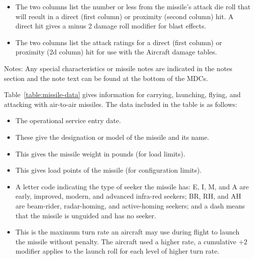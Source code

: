 {\begin{itemize}
    \item {} The two columns list the number or less from the missile's attack die roll that will result in a direct (first column) or proximity (second column) hit. A direct hit gives a minus 2 damage roll modifier for blast effects.

    \item {} The two columns list the attack ratings for a direct (first column) or  proximity (2d column) hit for use with the Aircraft damage tables.

\end{itemize}

Notes: Any special characteristics or missile notes are indicated in the notes section and the note text can be found at the bottom of the MDCs.

}{
Table~\ref{table:missile-data} gives information for carrying, launching, flying, and attacking with air-to-air missiles. The data included in the table is as follows:

\begin{itemize}

    \item {} The operational service entry date.
    
    \item {} These give the designation or model of the missile and its name.

    \item {} This gives the missile weight in pounds (for load limits).

    \item {} This gives load points of the missile (for configuration limits).

    \item {} A letter code indicating the type of seeker the missile has: E, I, M, and A are early, improved, modern, and advanced infra-red seekers; BR, RH, and AH are beam-rider, radar-homing, and active-homing seekers; and a dash means that the missile is unguided and has no seeker.

    \item {} This is the maximum turn rate an aircraft may use during flight to launch the missile without penalty. The aircraft used a higher rate, a cumulative $+2$ modifier applies to the launch roll for each level of higher turn rate.


\end{itemize}}
